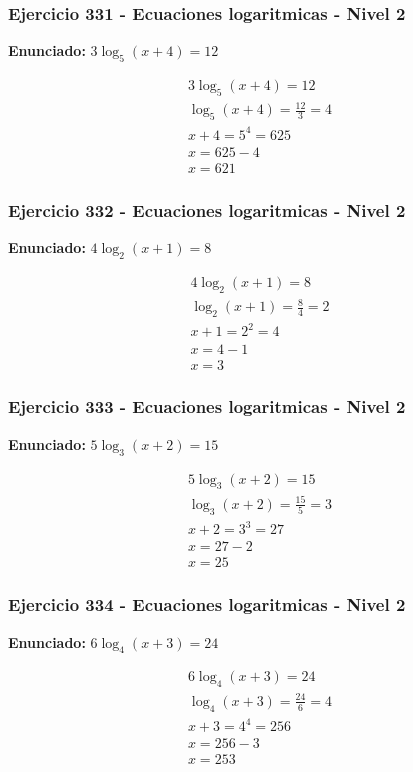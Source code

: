 \documentclass[12pt,a4paper]{article}
\begin{document}
\subsubsection*{Ejercicio 331 - Ecuaciones logaritmicas - Nivel 2}
\textbf{Enunciado:} \(3\log_{5}\left(x+4\right)=12\)

\[
\begin{aligned}
3\log_{5}\left(x+4\right)=12\\
\log_{5}\left(x+4\right)=\frac{12}{3}=4\\
x+4=5^{4}=625\\
x=625-4\\
\boxed{x=621}
\end{aligned}
\]


\subsubsection*{Ejercicio 332 - Ecuaciones logaritmicas - Nivel 2}
\textbf{Enunciado:} \(4\log_{2}\left(x+1\right)=8\)

\[
\begin{aligned}
4\log_{2}\left(x+1\right)=8\\
\log_{2}\left(x+1\right)=\frac{8}{4}=2\\
x+1=2^{2}=4\\
x=4-1\\
\boxed{x=3}
\end{aligned}
\]


\subsubsection*{Ejercicio 333 - Ecuaciones logaritmicas - Nivel 2}
\textbf{Enunciado:} \(5\log_{3}\left(x+2\right)=15\)

\[
\begin{aligned}
5\log_{3}\left(x+2\right)=15\\
\log_{3}\left(x+2\right)=\frac{15}{5}=3\\
x+2=3^{3}=27\\
x=27-2\\
\boxed{x=25}
\end{aligned}
\]


\subsubsection*{Ejercicio 334 - Ecuaciones logaritmicas - Nivel 2}
\textbf{Enunciado:} \(6\log_{4}\left(x+3\right)=24\)

\[
\begin{aligned}
6\log_{4}\left(x+3\right)=24\\
\log_{4}\left(x+3\right)=\frac{24}{6}=4\\
x+3=4^{4}=256\\
x=256-3\\
\boxed{x=253}
\end{aligned}
\]
\end{document}
